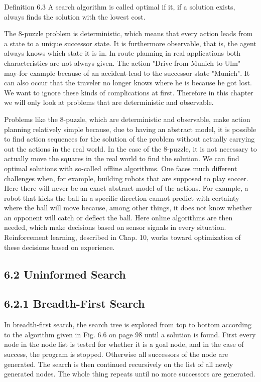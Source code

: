 \documentclass[10pt]{article}
\begin{document}
Definition 6.3 A search algorithm is called optimal if it, if a solution exists, always finds the solution with the lowest cost.

The 8-puzzle problem is deterministic, which means that every action leads from a state to a unique successor state. It is furthermore observable, that is, the agent always knows which state it is in. In route planning in real applications both characteristics are not always given. The action "Drive from Munich to Ulm" may-for example because of an accident-lead to the successor state "Munich". It can also occur that the traveler no longer knows where he is because he got lost. We want to ignore these kinds of complications at first. Therefore in this chapter we will only look at problems that are deterministic and observable.

Problems like the 8-puzzle, which are deterministic and observable, make action planning relatively simple because, due to having an abstract model, it is possible to find action sequences for the solution of the problem without actually carrying out the actions in the real world. In the case of the 8-puzzle, it is not necessary to actually move the squares in the real world to find the solution. We can find optimal solutions with so-called offline algorithms. One faces much different challenges when, for example, building robots that are supposed to play soccer. Here there will never be an exact abstract model of the actions. For example, a robot that kicks the ball in a specific direction cannot predict with certainty where the ball will move because, among other things, it does not know whether an opponent will catch or deflect the ball. Here online algorithms are then needed, which make decisions based on sensor signals in every situation. Reinforcement learning, described in Chap. 10, works toward optimization of these decisions based on experience.

\subsection*{6.2 Uninformed Search}
\subsection*{6.2.1 Breadth-First Search}
In breadth-first search, the search tree is explored from top to bottom according to the algorithm given in Fig. 6.6 on page 98 until a solution is found. First every node in the node list is tested for whether it is a goal node, and in the case of success, the program is stopped. Otherwise all successors of the node are generated. The search is then continued recursively on the list of all newly generated nodes. The whole thing repeats until no more successors are generated.
\end{document}
